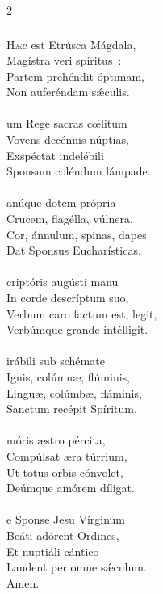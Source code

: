 \documentclass[9pt,twoside]{extarticle}
\begin{document}
\begin{multicols}{2}
{{{\subsubsection*{\center {}}
\begin{center}\end{center}
\lettrine{H}æc est Etrúsca Mágdala,\\
Magístra veri spíritus~:\\
Partem prehéndit óptimam,\\
Non auferéndam sǽculis.\\
\\
um Rege sacras cœ́litum\\
Vovens decénnis núptias,\\
Exspéctat indelébili\\
Sponsum coléndum lámpade.\\
\\
anúque dotem própria\\
Crucem, flagélla, vúlnera,\\
Cor, ánnulum, spinas, dapes\\
Dat Sponsus Eucharísticas.\\
\\
criptóris augústi manu\\
In corde descríptum suo,\\
Verbum caro factum est, legit,\\
Verbúmque grande intélligit.\\
\\
irábili sub schémate\\
Ignis, colúmnæ, flúminis,\\
Linguæ, colúmbæ, fláminis,\\
Sanctum recépit Spíritum.\\
\\
móris æstro pércita,\\
Compúlsat æra túrrium,\\
Ut totus orbis cónvolet,\\
Deúmque amórem díligat.\\
\\
e Sponse Jesu Vírginum\\
Beáti adórent Ordines,\\
Et nuptiáli cántico\\
Laudent per omne sǽculum.\\
Amen.

}}}
\end{multicols}
\end{document}
